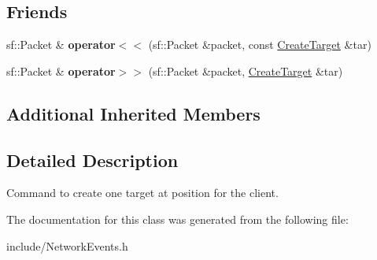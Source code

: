 \subsection*{Friends}
\begin{DoxyCompactItemize}
\item 
\hypertarget{class_create_target_a1a4d3db635e21c29e29d3e7c08c255f0}{sf\-::\-Packet \& {\bfseries operator$<$$<$} (sf\-::\-Packet \&packet, const \hyperlink{class_create_target}{Create\-Target} \&tar)}\label{class_create_target_a1a4d3db635e21c29e29d3e7c08c255f0}

\item 
\hypertarget{class_create_target_a265aabcb9cbf27ec6af2305decfd677f}{sf\-::\-Packet \& {\bfseries operator$>$$>$} (sf\-::\-Packet \&packet, \hyperlink{class_create_target}{Create\-Target} \&tar)}\label{class_create_target_a265aabcb9cbf27ec6af2305decfd677f}

\end{DoxyCompactItemize}
\subsection*{Additional Inherited Members}


\subsection{Detailed Description}
Command to create one target at position for the client. 



The documentation for this class was generated from the following file\-:\begin{DoxyCompactItemize}
\item 
include/Network\-Events.\-h\end{DoxyCompactItemize}
